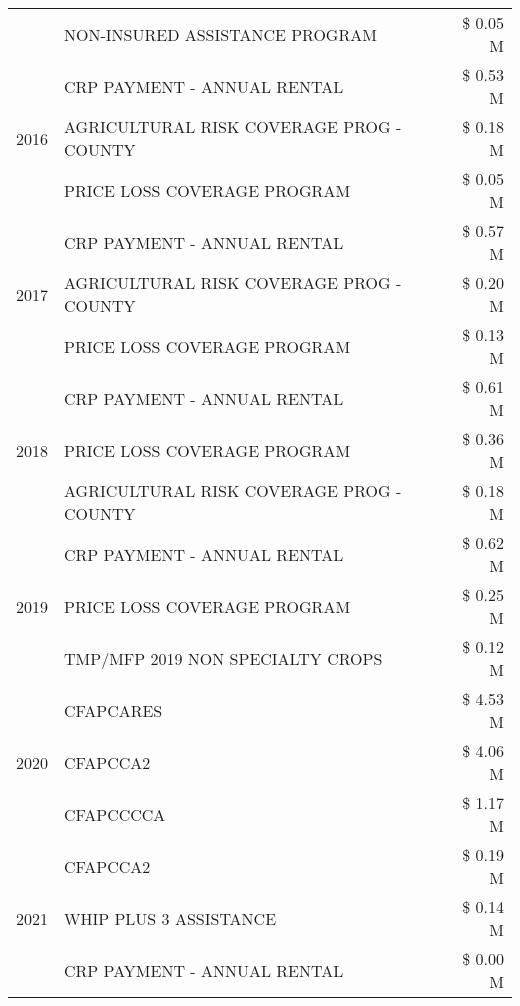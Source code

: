 \begin{tabular}{llr}
 & NON-INSURED ASSISTANCE PROGRAM & \$ 0.05 M \\
\cline{1-3}
\multirow[t]{3}{*}{2016} & CRP PAYMENT - ANNUAL RENTAL                   & \$ 0.53 M \\
 & AGRICULTURAL RISK COVERAGE PROG - COUNTY      & \$ 0.18 M \\
 & PRICE LOSS COVERAGE PROGRAM                   & \$ 0.05 M \\
\cline{1-3}
\multirow[t]{3}{*}{2017} & CRP PAYMENT - ANNUAL RENTAL & \$ 0.57 M \\
 & AGRICULTURAL RISK COVERAGE PROG - COUNTY & \$ 0.20 M \\
 & PRICE LOSS COVERAGE PROGRAM & \$ 0.13 M \\
\cline{1-3}
\multirow[t]{3}{*}{2018} & CRP PAYMENT - ANNUAL RENTAL & \$ 0.61 M \\
 & PRICE LOSS COVERAGE PROGRAM & \$ 0.36 M \\
 & AGRICULTURAL RISK COVERAGE PROG - COUNTY & \$ 0.18 M \\
\cline{1-3}
\multirow[t]{3}{*}{2019} & CRP PAYMENT - ANNUAL RENTAL & \$ 0.62 M \\
 & PRICE LOSS COVERAGE PROGRAM & \$ 0.25 M \\
 & TMP/MFP 2019 NON SPECIALTY CROPS & \$ 0.12 M \\
\cline{1-3}
\multirow[t]{3}{*}{2020} & CFAPCARES & \$ 4.53 M \\
 & CFAPCCA2 & \$ 4.06 M \\
 & CFAPCCCCA & \$ 1.17 M \\
\cline{1-3}
\multirow[t]{3}{*}{2021} & CFAPCCA2 & \$ 0.19 M \\
 & WHIP PLUS 3 ASSISTANCE & \$ 0.14 M \\
 & CRP PAYMENT - ANNUAL RENTAL & \$ 0.00 M \\
\cline{1-3}
\bottomrule
\end{tabular}
